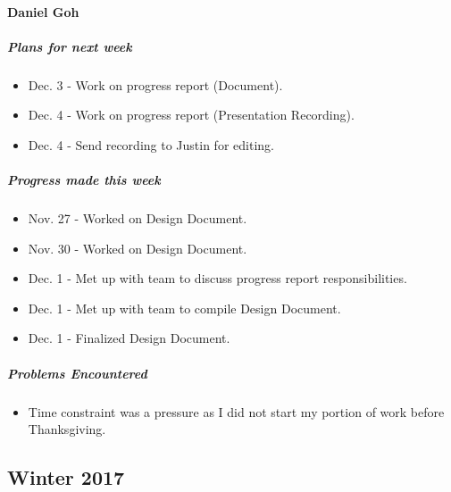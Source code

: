 {\vspace{3mm}

\paragraph{Daniel Goh}
\subparagraph{Plans for next week}
\begin{itemize}
  \item Dec. 3 - Work on progress report (Document).
  \item Dec. 4 - Work on progress report (Presentation Recording).
  \item Dec. 4 - Send recording to Justin for editing.
\end{itemize}

\subparagraph{Progress made this week}
\begin{itemize}
  \item Nov. 27 - Worked on Design Document.
  \item Nov. 30 - Worked on Design Document.
  \item Dec. 1 - Met up with team to discuss progress report responsibilities.
  \item Dec. 1 - Met up with team to compile Design Document.
  \item Dec. 1 - Finalized Design Document.
\end{itemize}

\subparagraph{Problems Encountered}
\begin{itemize}
  \item Time constraint was a pressure as I did not start my portion of work before Thanksgiving.
\end{itemize}

}

\newpage

\subsection{Winter 2017}

